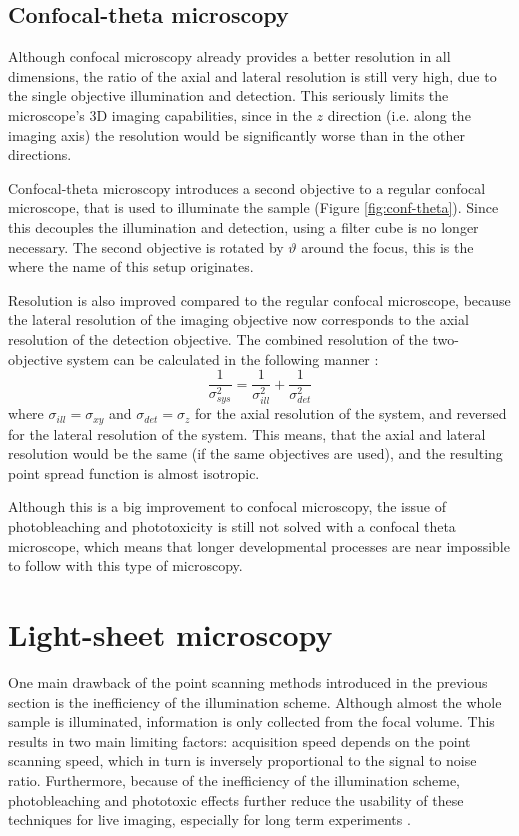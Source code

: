 \documentclass{diploma_style}
\begin{document}
\subsection{Confocal-theta microscopy}

Although confocal microscopy already provides a better resolution in all dimensions, the ratio of the axial and lateral resolution is still very high, due to the single objective illumination and detection. This seriously limits the microscope's 3D imaging capabilities, since in the $z$ direction (i.e. along the imaging axis) the resolution would be significantly worse than in the other directions.

Confocal-theta microscopy \cite{stelzer_fundamental_1994} introduces a second objective to a regular confocal microscope, that is used to illuminate the sample (Figure \ref{fig:conf-theta}). Since this decouples the illumination and detection, using a filter cube is no longer necessary. The second objective is rotated by $\vartheta$ around the focus, this is the where the name of this setup originates.

Resolution is also improved compared to the regular confocal microscope, because the lateral resolution of the imaging objective now corresponds to the axial resolution of the detection objective. The combined resolution of the two-objective system can be calculated in the following manner \cite{krzic_multiple-view_2009}:
\begin{equation}
\frac{1}{\sigma _{sys}^2} = \frac{1}{\sigma _{ill}^2} + \frac{1}{\sigma _{det}^2}
\end{equation}
where $\sigma_{ill} = \sigma_{xy}$ and $\sigma_{det} = \sigma_z$ for the axial resolution of the system, and reversed for the lateral resolution of the system. This means, that the axial and lateral resolution would be the same (if the same objectives are used), and the resulting point spread function is almost isotropic.

Although this is a big improvement to confocal microscopy, the issue of photobleaching and phototoxicity is still not solved with a confocal theta microscope, which means that longer developmental processes are near impossible to follow with this type of microscopy.




\section{Light-sheet microscopy}
\label{sec:light-sheet}
One main drawback of the point scanning methods introduced in the previous section is the inefficiency of the illumination scheme. Although almost the whole sample is illuminated, information is only collected from the focal volume. This results in two main limiting factors: acquisition speed depends on the point scanning speed, which in turn is inversely proportional to the signal to noise ratio. Furthermore, because of the inefficiency of the illumination scheme, photobleaching and phototoxic effects further reduce the usability of these techniques for live imaging, especially for long term experiments \cite{}.
\end{document}
